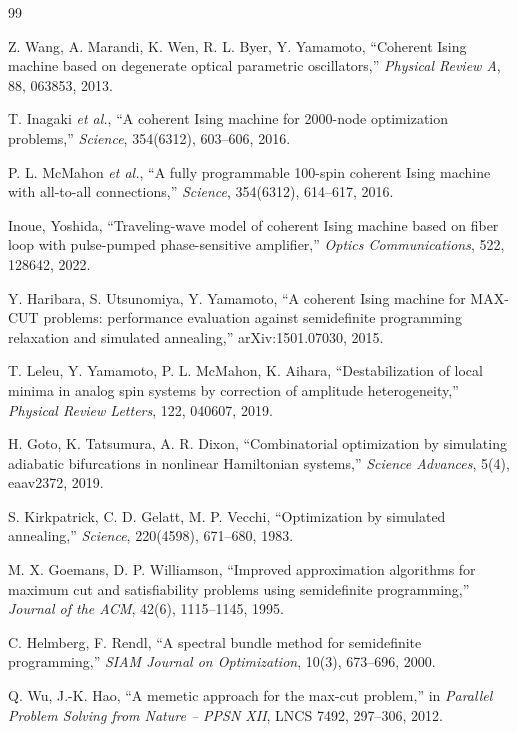 \begin{thebibliography}{99}\small

 Z. Wang, A. Marandi, K. Wen, R. L. Byer, Y. Yamamoto, ``Coherent Ising machine based on degenerate optical parametric oscillators,'' \textit{Physical Review A}, 88, 063853, 2013.

 T. Inagaki \textit{et al.}, ``A coherent Ising machine for 2000-node optimization problems,'' \textit{Science}, 354(6312), 603--606, 2016.

 P. L. McMahon \textit{et al.}, ``A fully programmable 100-spin coherent Ising machine with all-to-all connections,'' \textit{Science}, 354(6312), 614--617, 2016.

 Inoue, Yoshida, ``Traveling-wave model of coherent Ising machine based on fiber loop with pulse-pumped phase-sensitive amplifier,'' \textit{Optics Communications}, 522, 128642, 2022.

 Y. Haribara, S. Utsunomiya, Y. Yamamoto, ``A coherent Ising machine for MAX-CUT problems: performance evaluation against semidefinite programming relaxation and simulated annealing,'' arXiv:1501.07030, 2015.

 T. Leleu, Y. Yamamoto, P. L. McMahon, K. Aihara, ``Destabilization of local minima in analog spin systems by correction of amplitude heterogeneity,'' \textit{Physical Review Letters}, 122, 040607, 2019.

 H. Goto, K. Tatsumura, A. R. Dixon, ``Combinatorial optimization by simulating adiabatic bifurcations in nonlinear Hamiltonian systems,'' \textit{Science Advances}, 5(4), eaav2372, 2019.

 S. Kirkpatrick, C. D. Gelatt, M. P. Vecchi, ``Optimization by simulated annealing,'' \textit{Science}, 220(4598), 671--680, 1983.

 M. X. Goemans, D. P. Williamson, ``Improved approximation algorithms for maximum cut and satisfiability problems using semidefinite programming,'' \textit{Journal of the ACM}, 42(6), 1115--1145, 1995.

 C. Helmberg, F. Rendl, ``A spectral bundle method for semidefinite programming,'' \textit{SIAM Journal on Optimization}, 10(3), 673--696, 2000.

 Q. Wu, J.-K. Hao, ``A memetic approach for the max-cut problem,'' in \textit{Parallel Problem Solving from Nature -- PPSN XII}, LNCS 7492, 297--306, 2012.


\end{thebibliography}
